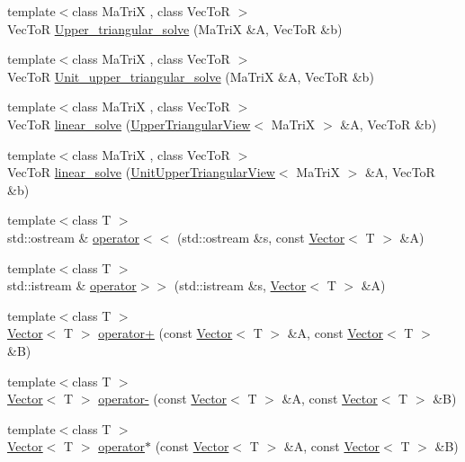 \begin{DoxyCompactItemize}
{\footnotesize template$<$class MaTriX , class VecToR $>$ }\\VecToR \hyperlink{namespace_t_n_t_a04eefd4672398e54eb288413564a59e3}{Upper\_\-triangular\_\-solve} (MaTriX \&A, VecToR \&b)
\item 
{\footnotesize template$<$class MaTriX , class VecToR $>$ }\\VecToR \hyperlink{namespace_t_n_t_ab74dbcd7549f5677e791ef40bbb28e5e}{Unit\_\-upper\_\-triangular\_\-solve} (MaTriX \&A, VecToR \&b)
\item 
{\footnotesize template$<$class MaTriX , class VecToR $>$ }\\VecToR \hyperlink{namespace_t_n_t_a4d7d5a1d9679310cb1b6df7c3d57135f}{linear\_\-solve} (\hyperlink{class_t_n_t_1_1_upper_triangular_view}{UpperTriangularView}$<$ MaTriX $>$ \&A, VecToR \&b)
\item 
{\footnotesize template$<$class MaTriX , class VecToR $>$ }\\VecToR \hyperlink{namespace_t_n_t_a59966684c146cdad2eafe07c62922354}{linear\_\-solve} (\hyperlink{class_t_n_t_1_1_unit_upper_triangular_view}{UnitUpperTriangularView}$<$ MaTriX $>$ \&A, VecToR \&b)
\item 
{\footnotesize template$<$class T $>$ }\\std::ostream \& \hyperlink{namespace_t_n_t_abde63a52052fdea9dee4e0b93de1ea31}{operator$<$$<$} (std::ostream \&s, const \hyperlink{class_t_n_t_1_1_vector}{Vector}$<$ T $>$ \&A)
\item 
{\footnotesize template$<$class T $>$ }\\std::istream \& \hyperlink{namespace_t_n_t_af6e388c7d420d577ed9cc637434ca9e8}{operator$>$$>$} (std::istream \&s, \hyperlink{class_t_n_t_1_1_vector}{Vector}$<$ T $>$ \&A)
\item 
{\footnotesize template$<$class T $>$ }\\\hyperlink{class_t_n_t_1_1_vector}{Vector}$<$ T $>$ \hyperlink{namespace_t_n_t_a43a2485a56e5fcee7889f38c6508e0c8}{operator+} (const \hyperlink{class_t_n_t_1_1_vector}{Vector}$<$ T $>$ \&A, const \hyperlink{class_t_n_t_1_1_vector}{Vector}$<$ T $>$ \&B)
\item 
{\footnotesize template$<$class T $>$ }\\\hyperlink{class_t_n_t_1_1_vector}{Vector}$<$ T $>$ \hyperlink{namespace_t_n_t_a8b095f7f115ba4696117dd2620788023}{operator-\/} (const \hyperlink{class_t_n_t_1_1_vector}{Vector}$<$ T $>$ \&A, const \hyperlink{class_t_n_t_1_1_vector}{Vector}$<$ T $>$ \&B)
\item 
{\footnotesize template$<$class T $>$ }\\\hyperlink{class_t_n_t_1_1_vector}{Vector}$<$ T $>$ \hyperlink{namespace_t_n_t_a82d5050bcaa4f22b3e38182e5615c823}{operator$\ast$} (const \hyperlink{class_t_n_t_1_1_vector}{Vector}$<$ T $>$ \&A, const \hyperlink{class_t_n_t_1_1_vector}{Vector}$<$ T $>$ \&B)

\end{DoxyCompactItemize}
